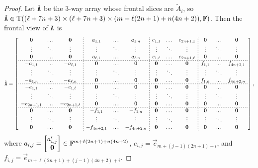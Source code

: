 \documentclass[11pt]{article}
\begin{document}
\begin{proof}
Let $\tilde{\mathtt{A}}$ be the 
$3$-way array whose frontal slices are $\tilde A_i$, so 
$\tilde{\mathtt{A}}\in\mathrm{T}((\ell+7n+3)\times
(\ell+7n+3)\times(m+\ell(2n+1)+n(4n+2)), \mathbb{F})$. Then the frontal view of 
$\tilde{\mathtt{A}}$ is 
$$
\tilde\tA=\left[ \begin{array}{ccc;{2pt/2pt}ccc;{2pt/2pt}ccc;{2pt/2pt}ccc}
\vzero & \dots  & \vzero & a_{1,1} & \dots & a_{1,n} & e_{1,1} & \dots & e_{2n+1, 
1} & \vzero & \dots & \vzero\\
\vdots & \ddots & \vdots & \vdots & \ddots & \vdots & \vdots & \ddots & \vdots & 
\vdots & \ddots & \vdots \\
\vzero & \dots  & \vzero & a_{\ell, 1} & \dots & a_{\ell, n} & e_{1, \ell} & 
\dots & e_{2n+1, \ell} & \vzero & \dots & \vzero \\ \hdashline[2pt/2pt]
-a_{1,1} & \dots & -a_{\ell, 1} & \vzero & \dots & \vzero & \vzero & \dots & 
\vzero & f_{1,1} & \dots & f_{4n+2, 1} \\
\vdots & \ddots & \vdots & \vdots & \ddots & \vdots & \vdots & \ddots & \vdots & 
\vdots & \ddots & \vdots \\
-a_{1,n} & \dots & -a_{\ell, n} & \vzero & \dots & \vzero & \vzero & \dots & 
\vzero & f_{1,n} & \dots & f_{4n+2, n} \\  \hdashline[2pt/2pt]
-e_{1,1} & \dots & -e_{1, \ell} & \vzero & \dots & \vzero & \vzero & \dots & 
\vzero 
& \vzero & \dots & \vzero \\
\vdots & \ddots & \vdots & \vdots & \ddots & \vdots & \vdots & \ddots & \vdots & 
\vdots & \ddots & \vdots \\
-e_{2n+1, 1} & \dots & -e_{2n+1, \ell} & \vzero & \dots & \vzero & \vzero & \dots 
& 
\vzero & \vzero & \dots & \vzero \\  \hdashline[2pt/2pt]
\vzero & \dots & \vzero & -f_{1,1} & \dots & -f_{1, n} & \vzero & \dots & \vzero & 
\vzero & \dots & \vzero \\
\vdots & \ddots & \vdots & \vdots & \ddots & \vdots & \vdots & \ddots & \vdots & 
\vdots & \ddots & \vdots \\
\vzero & \dots & \vzero & -f_{4n+2, 1} & \dots & -f_{4n+2, n} & \vzero & \dots & 
\vzero & \vzero & \dots & \vzero 
\end{array}\right], 
$$
where $a_{i,j}=\begin{bmatrix} a_{i,j}'\\ \mathbf{0} \end{bmatrix} 
\in\mathbb{F}^{m+\ell(2n+1)+n(4n+2)}$, $e_{i,j}=\vec{e}_{m+(j-1)(2n+1)+i}$, and 
$f_{i,j}=\vec{e}_{m+\ell(2n+1)+(j-1)(4n+2)+i}$. 


\end{proof}
\end{document}
